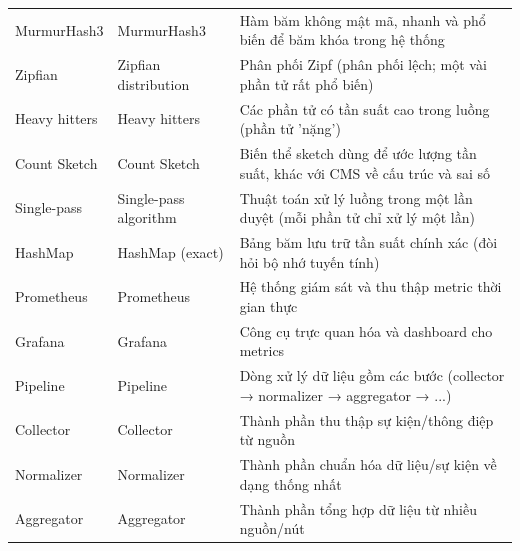 \begin{longtable}{@{}p{3.5cm} >{\raggedright\arraybackslash}p{6cm} >{\raggedright\arraybackslash}p{5cm}@{}}
MurmurHash3 & MurmurHash3 & Hàm băm không mật mã, nhanh và phổ biến để băm khóa trong hệ thống \\
Zipfian & Zipfian distribution & Phân phối Zipf (phân phối lệch; một vài phần tử rất phổ biến) \\
Heavy hitters & Heavy hitters & Các phần tử có tần suất cao trong luồng (phần tử 'nặng') \\
Count Sketch & Count Sketch & Biến thể sketch dùng để ước lượng tần suất, khác với CMS về cấu trúc và sai số \\
Single-pass & Single-pass algorithm & Thuật toán xử lý luồng trong một lần duyệt (mỗi phần tử chỉ xử lý một lần) \\
HashMap & HashMap (exact) & Bảng băm lưu trữ tần suất chính xác (đòi hỏi bộ nhớ tuyến tính) \\
Prometheus & Prometheus & Hệ thống giám sát và thu thập metric thời gian thực \\
Grafana & Grafana & Công cụ trực quan hóa và dashboard cho metrics \\
Pipeline & Pipeline & Dòng xử lý dữ liệu gồm các bước (collector → normalizer → aggregator → ...) \\
Collector & Collector & Thành phần thu thập sự kiện/thông điệp từ nguồn \\
Normalizer & Normalizer & Thành phần chuẩn hóa dữ liệu/sự kiện về dạng thống nhất \\
Aggregator & Aggregator & Thành phần tổng hợp dữ liệu từ nhiều nguồn/nút \\


\end{longtable}
